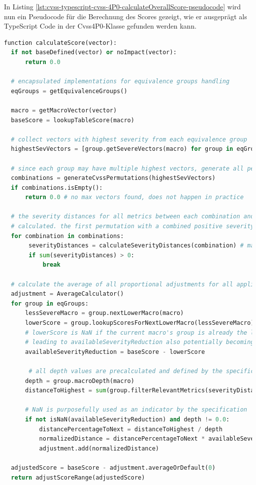 \newpage
In Listing \ref{lst:cvss-typescript-cvss-4P0-calculateOverallScore-pseudocode} wird nun ein Pseudocode für die Berechnung des Scores gezeigt, wie er ausgeprägt als TypeScript Code in der Cvss4P0-Klasse gefunden werden kann.

\begin{lstlisting}[language=Python, label={lst:cvss-typescript-cvss-4P0-calculateOverallScore-pseudocode}, caption={CVSS 4.0 Score-Berechnung Pseudocode}, basicstyle=\scriptsize]
function calculateScore(vector):
  if not baseDefined(vector) or noImpact(vector):
      return 0.0

  # encapsulated implementations for equivalence groups handling
  eqGroups = getEquivalenceGroups()

  macro = getMacroVector(vector)
  baseScore = lookupTableScore(macro)

  # collect vectors with highest severity from each equivalence group
  highestSevVectors = [group.getSevereVectors(macro) for group in eqGroups]

  # since each group may have multiple highest vectors, generate all permutations
  combinations = generateCvssPermutations(highestSevVectors)
  if combinations.isEmpty():
      return 0.0 # no max vectors found, does not happen in practice

  # the severity distances for all metrics between each combination and the input vector are
  # calculated. the first permutation with a combined positive severity distance is selected.
  for combination in combinations:
       severityDistances = calculateSeverityDistances(combination) # map<metric, distance>
       if sum(severityDistances) > 0:
           break

  # calculate the average of all proportional adjustments for all applicable groups
  adjustment = AverageCalculator()
  for group in eqGroups:
      lessSevereMacro = group.nextLowerMacro(macro)
      lowerScore = group.lookupScoresForNextLowerMacro(lessSevereMacro)
      # lowerScore is NaN if the current macro's group is already the lowest,
      # leading to availableSeverityReduction also potentially becoming NaN
      availableSeverityReduction = baseScore - lowerScore

       # all depth values are precalculated and defined by the specification
      depth = group.macroDepth(macro)
      distanceToHighest = sum(group.filterRelevantMetrics(severityDistances))

      # NaN is purposefully used as an indicator by the specification
      if not isNaN(availableSeverityReduction) and depth != 0.0:
          distancePercentageToNext = distanceToHighest / depth
          normalizedDistance = distancePercentageToNext * availableSeverityReduction
          adjustment.add(normalizedDistance)

  adjustedScore = baseScore - adjustment.averageOrDefault(0)
  return adjustScoreRange(adjustedScore)
\end{lstlisting}
